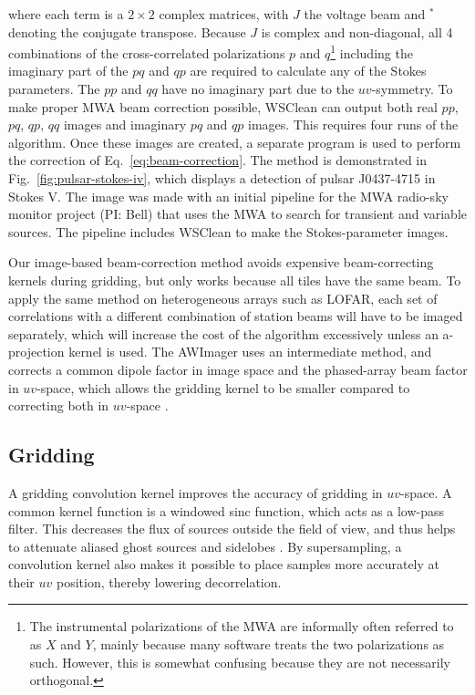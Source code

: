 \documentclass[useAMS,usenatbib]{mn2e}
\begin{document}
where each term is a $2\times2$ complex matrices, with $J$ the voltage beam and $^*$ denoting the conjugate transpose. Because $J$ is complex and non-diagonal, all 4 combinations of the cross-correlated polarizations $p$ and $q$\footnote{The instrumental polarizations of the MWA are informally often referred to as $X$ and $Y$, mainly because many software treats the two polarizations as such. However, this is somewhat confusing because they are not necessarily orthogonal.} including the imaginary part of the $pq$ and $qp$ are required to calculate any of the Stokes parameters. The $pp$ and $qq$ have no imaginary part due to the $uv$-symmetry. To make proper MWA beam correction possible, WSClean can output both real $pp$, $pq$, $qp$, $qq$ images and imaginary $pq$ and $qp$ images. This requires four runs of the algorithm. Once these images are created, a separate program is used to perform the correction of Eq.~\eqref{eq:beam-correction}. The method is demonstrated in Fig.~\ref{fig:pulsar-stokes-iv}, which displays a detection of pulsar J0437-4715 in Stokes V. The image was made with an initial pipeline for the MWA radio-sky monitor project (PI: Bell) that uses the MWA to search for transient and variable sources. The pipeline includes WSClean to make the Stokes-parameter images.

Our image-based beam-correction method avoids expensive beam-correcting kernels during gridding, but only works because all tiles have the same beam. To apply the same method on heterogeneous arrays such as LOFAR, each set of correlations with a different combination of station beams will have to be imaged separately, which will increase the cost of the algorithm excessively unless an a-projection kernel is used. The AWImager uses an intermediate method, and corrects a common dipole factor in image space and the phased-array beam factor in $uv$-space, which allows the gridding kernel to be smaller compared to correcting both in $uv$-space \citep{awimager-2013}.

\subsection{Gridding} \label{sec:gridding}
A gridding convolution kernel improves the accuracy of gridding in $uv$-space. A common kernel function is a windowed sinc function, which acts as a low-pass filter. This decreases the flux of sources outside the field of view, and thus helps to attenuate aliased ghost sources and sidelobes \citep{post-correlation-filtering}. By supersampling, a convolution kernel also makes it possible to place samples more accurately at their $uv$ position, thereby lowering decorrelation.
\end{document}
